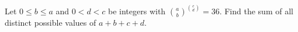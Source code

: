 Let $0\le b\le a$ and $0<d<c$ be integers with $\binom ab^{\binom cd}=36$. Find the sum of all distinct possible values of $a+b+c+d$.
